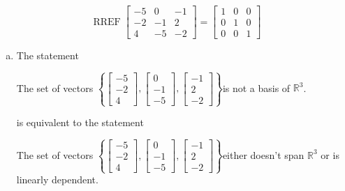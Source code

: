 \begin{exerciseAnswer} 


\[\operatorname{RREF} \left[\begin{array}{ccc}
-5 & 0 & -1 \\
-2 & -1 & 2 \\
4 & -5 & -2
\end{array}\right] = \left[\begin{array}{ccc}
1 & 0 & 0 \\
0 & 1 & 0 \\
0 & 0 & 1
\end{array}\right] \]


\begin{enumerate}[(a)]
\item The statement 
\begin{center}\begin{minipage}{0.8\textwidth}
 The set of vectors \( \left\{ \left[\begin{array}{c}
-5 \\
-2 \\
4
\end{array}\right] , \left[\begin{array}{c}
0 \\
-1 \\
-5
\end{array}\right] , \left[\begin{array}{c}
-1 \\
2 \\
-2
\end{array}\right] \right\} \)is not a basis of \(\mathbb{R}^3\). 
\end{minipage}\end{center}
     is equivalent to the statement 
\begin{center}\begin{minipage}{0.8\textwidth}
 The set of vectors \( \left\{ \left[\begin{array}{c}
-5 \\
-2 \\
4
\end{array}\right] , \left[\begin{array}{c}
0 \\
-1 \\
-5
\end{array}\right] , \left[\begin{array}{c}
-1 \\
2 \\
-2
\end{array}\right] \right\} \)either doesn't span \(\mathbb{R}^3\) or is linearly dependent.
\end{minipage}\end{center}
    

\end{enumerate}
\end{exerciseAnswer}
